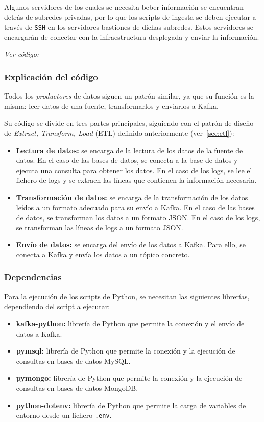 Algunos servidores de los cuales se necesita beber información se encuentran
detrás de subredes privadas, por lo que los scripts de ingesta se deben ejecutar
a través de \texttt{SSH} en los servidores bastiones de dichas subredes. Estos
servidores se encargarán de conectar con la infraestructura desplegada y enviar
la información.

\textit{Ver código: }


\subsubsection{Explicación del código}
Todos los \textit{productores} de datos siguen un patrón similar, ya que su
función es la misma: leer datos de una fuente, transformarlos y enviarlos a
Kafka.

Su código se divide en tres partes principales, siguiendo con el patrón de
diseño de \textit{Extract, Transform, Load} (ETL) definido anteriormente
(ver~\ref{sec:etl}):

\begin{itemize}
	\item \textbf{Lectura de datos:} se encarga de la lectura de los datos de
		la fuente de datos. En el caso de las bases de datos, se conecta a la
		base de datos y ejecuta una consulta para obtener los datos. En el caso
		de los logs, se lee el fichero de logs y se extraen las líneas que
		contienen la información necesaria.
	\item \textbf{Transformación de datos:} se encarga de la transformación de
		los datos leídos a un formato adecuado para su envío a Kafka. En el caso
		de las bases de datos, se transforman los datos a un formato JSON. En el
		caso de los logs, se transforman las líneas de logs a un formato JSON.
	\item \textbf{Envío de datos:} se encarga del envío de los datos a Kafka.
		Para ello, se conecta a Kafka y envía los datos a un tópico concreto.
\end{itemize}


\newpage{}
\subsubsection{Dependencias}
Para la ejecución de los scripts de Python, se necesitan las siguientes
librerías, dependiendo del script a ejecutar:

\begin{itemize}
	\item \textbf{kafka-python:} librería de Python que permite la conexión y
		el envío de datos a Kafka.
	\item \textbf{pymsql:} librería de Python que permite la conexión y la
		ejecución de consultas en bases de datos MySQL.
	\item \textbf{pymongo:} librería de Python que permite la conexión y la
		ejecución de consultas en bases de datos MongoDB.
	\item \textbf{python-dotenv:} librería de Python que permite la carga de
		variables de entorno desde un fichero \texttt{.env}.
\end{itemize}


